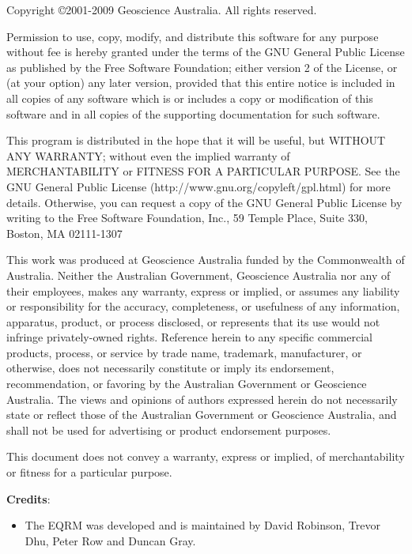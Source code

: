\documentclass{article}
\begin{document}
\vspace*{0.5in}

Copyright \copyright 2001-2009 Geoscience Australia. All rights
reserved.

\vspace*{0.2in}

Permission to use, copy, modify, and distribute this software for any
purpose without fee is hereby granted under the terms of the GNU
General Public License as published by the Free Software Foundation;
either version 2 of the License, or (at your option) any later
version, provided that this entire notice is included in all copies
of any software which is or includes a copy or modification of this
software and in all copies of the supporting documentation for such
software.

This program is distributed in the hope that it will be useful, but
WITHOUT ANY WARRANTY; without even the implied warranty of
MERCHANTABILITY or FITNESS FOR A PARTICULAR PURPOSE.  See the GNU
General Public License (http://www.gnu.org/copyleft/gpl.html) for
more details. Otherwise, you can request a copy of the GNU General
Public License by writing to the Free Software Foundation, Inc., 59
Temple Place, Suite 330, Boston, MA 02111-1307

This work was produced at Geoscience Australia funded by the Commonwealth of Australia. Neither
the Australian Government, Geoscience Australia nor any of their employees, makes any warranty,
express or implied, or assumes any liability or responsibility for
the accuracy, completeness, or usefulness of any information,
apparatus, product, or process disclosed, or represents that its use
would not infringe privately-owned rights. Reference herein to any
specific commercial products, process, or service by trade name,
trademark, manufacturer, or otherwise, does not necessarily
constitute or imply its endorsement, recommendation, or favoring by
the Australian Government or Geoscience Australia.  The views and opinions of authors expressed
herein do not necessarily state or reflect those of the Australian
Government or Geoscience Australia, and shall not be used for advertising or product
endorsement purposes.

This document does not convey a warranty, express or implied,
of merchantability or fitness for a particular purpose.

  \vspace{0.2in}

\textbf{Credits}:
\begin{itemize}
\item The EQRM was developed and is maintained by David Robinson, Trevor Dhu, Peter Row
and Duncan Gray.
\end{itemize}
\end{document}
